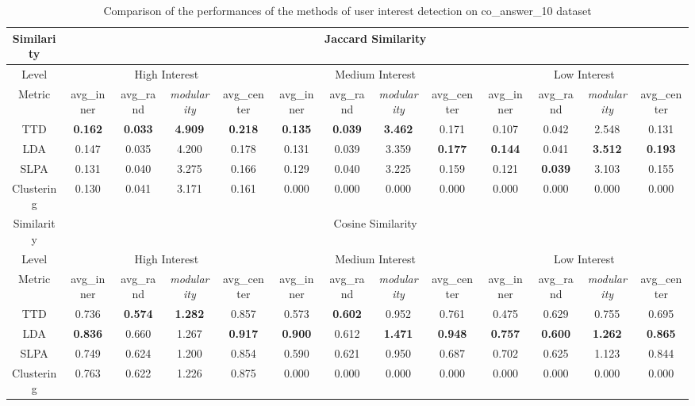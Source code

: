 \begin{sidewaystable}

\caption{Comparison of the performances of the methods of user interest detection on co\_answer\_10 dataset}
\label{tab:uidcompare10}
\scriptsize
\centering
\begin{tabular}{|c|c|c|c|c|c|c|c|c|c|c|c|c|}

\hline
Similarity & \multicolumn{12}{c|}{Jaccard Similarity}  \\
\hline
Level  &  \multicolumn{4}{c|}{High Interest} & \multicolumn{4}{c|}{Medium Interest} &  \multicolumn{4}{c|}{Low Interest} \\
\hline
Metric  & avg\_inner & avg\_rand & \textit{modularity} & avg\_center& avg\_inner & avg\_rand & \textit{modularity} & avg\_center& avg\_inner & avg\_rand & \textit{modularity} & avg\_center \\
\hline
TTD&\textbf{0.162}&\textbf{0.033}&\textbf{4.909}&\textbf{0.218}&\textbf{0.135}&\textbf{0.039}&\textbf{3.462}&0.171&0.107&0.042&2.548&0.131\\
\hline
LDA&0.147&0.035&4.200&0.178&0.131&0.039&3.359&\textbf{0.177}&\textbf{0.144}&0.041&\textbf{3.512}&\textbf{0.193}\\
\hline
SLPA&0.131&0.040&3.275&0.166&0.129&0.040&3.225&0.159&0.121&\textbf{0.039}&3.103&0.155\\
\hline
Clustering&0.130&0.041&3.171&0.161&0.000&0.000&0.000&0.000&0.000&0.000&0.000&0.000\\
\hline
Similarity & \multicolumn{12}{c|}{Cosine Similarity}  \\
\hline
Level  &  \multicolumn{4}{c|}{High Interest} & \multicolumn{4}{c|}{Medium Interest} &  \multicolumn{4}{c|}{Low Interest} \\
\hline
Metric  & avg\_inner & avg\_rand & \textit{modularity} & avg\_center& avg\_inner & avg\_rand & \textit{modularity} & avg\_center& avg\_inner & avg\_rand & \textit{modularity} & avg\_center \\ 
\hline
TTD&0.736&\textbf{0.574}&\textbf{1.282}&0.857&0.573&\textbf{0.602}&0.952&0.761&0.475&0.629&0.755&0.695\\ \hline
LDA&\textbf{0.836}&0.660&1.267&\textbf{0.917}&\textbf{0.900}&0.612&\textbf{1.471}&\textbf{0.948}&\textbf{0.757}&\textbf{0.600}&\textbf{1.262}&\textbf{0.865}\\ \hline
SLPA&0.749&0.624&1.200&0.854&0.590&0.621&0.950&0.687&0.702&0.625&1.123&0.844\\ \hline
Clustering&0.763&0.622&1.226&0.875&0.000&0.000&0.000&0.000&0.000&0.000&0.000&0.000\\ \hline
\end{tabular}

\end{sidewaystable}




